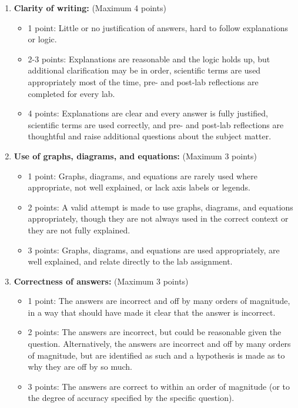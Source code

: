 \documentclass[10pt]{article}
\begin{document}
\begin{enumerate}
\item \textbf{Clarity of writing:} (Maximum 4 points)
\begin{itemize}
	\item 1 point: Little or no justification of answers, hard to follow explanations or logic.
	\item 2-3 points: Explanations are reasonable and the logic holds up, but additional clarification may be in order, scientific terms are used appropriately most of the time, pre- and post-lab reflections are completed for every lab.
	\item 4 points: Explanations are clear and every answer is fully justified, scientific terms are used correctly, and pre- and post-lab reflections are thoughtful and raise additional questions about the subject matter.
\end{itemize}
\item \textbf{Use of graphs, diagrams, and equations:} (Maximum 3 points)
\begin{itemize}
	\item 1 point: Graphs, diagrams, and equations are rarely used where appropriate, not well explained, or lack axis labels or legends.
	\item 2 points: A valid attempt is made to use graphs, diagrams, and equations appropriately, though they are not always used in the correct context or they are not fully explained.
	\item 3 points: Graphs, diagrams, and equations are used appropriately, are well explained, and relate directly to the lab assignment.
\end{itemize}
\item \textbf{Correctness of answers:} (Maximum 3 points)
\begin{itemize}
	\item 1 point: The answers are incorrect and off by many orders of magnitude, in a way that should have made it clear that the answer is incorrect.
	\item 2 points: The answers are incorrect, but could be reasonable given the question. Alternatively, the answers are incorrect and off by many orders of magnitude, but are identified as such and a hypothesis is made as to why they are off by so much.
	\item 3 points: The answers are correct to within an order of magnitude (or to the degree of accuracy specified by the specific question).
\end{itemize}
\end{enumerate}
\end{document}

